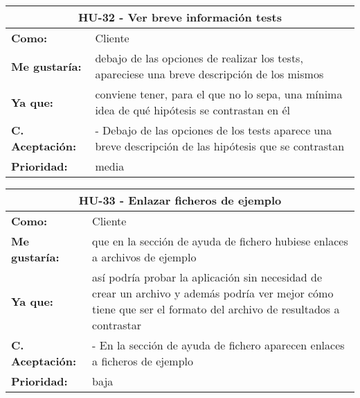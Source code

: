 \begin{table}[H]
	\begin{tabular}{| p{3cm}| p{11cm} |}
		\hline
		\multicolumn{2}{|c|}{\textbf{HU-32} - Ver breve información tests} \\ \hline
		\textbf{Como:} & Cliente \\ \hline
		\textbf{Me gustaría:} & debajo de las opciones de realizar los tests, apareciese una breve descripción de los mismos \\ \hline
		\textbf{Ya que:} & conviene tener, para el que no lo sepa, una mínima idea de qué hipótesis se contrastan en él \\ \hline
		\textbf{C. Aceptación:} & - Debajo de las opciones de los tests aparece una breve descripción de las hipótesis que se contrastan \\ \hline
		\textbf{\textbf{Prioridad:}} & media \\ \hline
	\end{tabular}
\end{table}


\begin{table}[H]
	\begin{tabular}{| p{3cm}| p{11cm} |}
		\hline
		\multicolumn{2}{|c|}{\textbf{HU-33} - Enlazar ficheros de ejemplo} \\ \hline
		\textbf{Como:} & Cliente \\ \hline
		\textbf{Me gustaría:} & que en la sección de ayuda de fichero hubiese enlaces a archivos de ejemplo \\ \hline
		\textbf{Ya que:} & así podría probar la aplicación sin necesidad de crear un archivo y además podría ver mejor cómo tiene que ser el formato del archivo de resultados a contrastar \\ \hline
		\textbf{C. Aceptación:} & - En la sección de ayuda de fichero aparecen enlaces a ficheros de ejemplo \\ \hline
		\textbf{\textbf{Prioridad:}} & baja \\ \hline
	\end{tabular}
\end{table}


